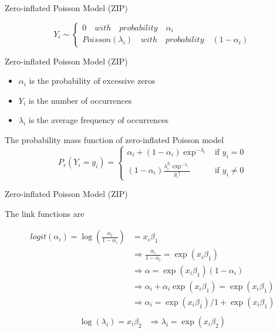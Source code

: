 \documentclass[aspectratio=169,xcolor=dvipsnames]{beamer}
\begin{document}
	
	\begin{frame}{Zero-inflated Poisson Model (ZIP)}
		\begin{Center}
			\[
			Y_{i} \sim 
			\begin{cases}
				0 \quad with \quad probability \quad \alpha_{i}\\
				Poisson(\lambda_{i}) \quad with \quad probability \quad (1 - \alpha_{i})
			\end{cases}
			\]
		\end{Center}
	\end{frame}
	\begin{frame}{Zero-inflated Poisson Model (ZIP)}
		\begin{itemize}
			\item $\alpha_{i}$ is the probability of excessive zeros
			\item $Y_{i}$ is the number of occurrences
			\item $\lambda_{i}$ is the average frequency of occurrences
		\end{itemize}
	
		
		
		\begin{block}{The probability mass function of zero-inflated Poisson model}
			\[
			P_{r}(Y_{i} = y_{i}) = 
			\begin{cases}
				\alpha_{i} + (1 - \alpha_{i}) \exp^{-\lambda_{i}} & \text{if } y_{i} = 0 \\
				(1 - \alpha_{i})\frac{\lambda_{i}^{y_{i}}\exp^{-\lambda_{i}}}{y_{i}!} & \text{if } y_{i} \neq 0 
			\end{cases}
			\]
		\end{block}
	\end{frame}
	
	\begin{frame}{Zero-inflated Poisson Model (ZIP)}
		
		\justifying The link functions are
		
		\begin{center}
			 \[
				\begin{aligned}
					logit(\alpha_{i}) = \log\left(\frac{\alpha_{i}}{1 - \alpha_{i}}\right) &= x_{i}\beta_{1}\\
					&\Rightarrow \frac{\alpha_{i}}{1-\alpha_{i}} = \exp(x_{i}\beta_{1})\\
					&\Rightarrow \alpha = \exp(x_{i}\beta_{1})(1-\alpha_{i})\\
					&\Rightarrow \alpha_{i} + \alpha_{i}\exp(x_{i}\beta_{1}) = \exp(x_{i}\beta_{1})\\
					&\Rightarrow \alpha_{i} = \exp(x_{i}\beta_{1}) / 1 + \exp(x_{i}\beta_{1})\\
				\end{aligned}
				\]		
			\[
			\begin{aligned}
				\log(\lambda_{i}) = x_{i}\beta_{2}
				&\Rightarrow \lambda_{i} = \exp(x_{i}\beta_{2})
			\end{aligned}
			\]
		\end{center}
		
	\end{frame}	
	
\end{document}
